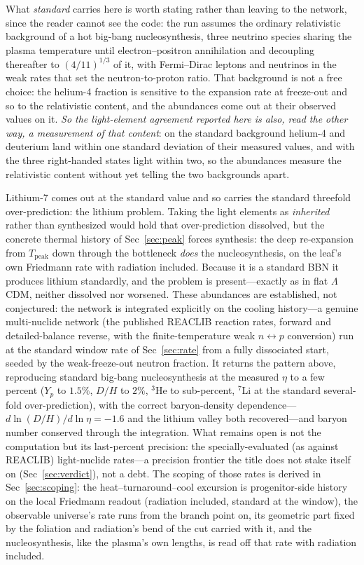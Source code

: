 \documentclass[11pt,a4paper]{article}
\theoremstyle{plain}
\theoremstyle{definition}
\theoremstyle{remark}
\newcommand{\Tpk}{T_{\mathrm{peak}}}
\begin{document}
What \emph{standard} carries here is worth stating rather than leaving to the network, since the reader cannot see the code: the run assumes the ordinary relativistic background of a hot big-bang nucleosynthesis, three neutrino species sharing the plasma temperature until electron--positron annihilation and decoupling thereafter to $(4/11)^{1/3}$ of it, with Fermi--Dirac leptons and neutrinos in the weak rates that set the neutron-to-proton ratio. That background is not a free choice: the helium-4 fraction is sensitive to the expansion rate at freeze-out and so to the relativistic content, and the abundances come out at their observed values on it. \emph{So the light-element agreement reported here is also, read the other way, a measurement of that content}: on the standard background helium-4 and deuterium land within one standard deviation of their measured values, and with the three right-handed states light within two, so the abundances measure the relativistic content without yet telling the two backgrounds apart.

Lithium-7 comes out at the standard value and so carries the standard threefold
over-prediction: the lithium problem. Taking the light elements as \emph{inherited} rather than
synthesized would hold that over-prediction dissolved, but the concrete thermal history of
Sec~\ref{sec:peak} forces synthesis: the deep re-expansion from $\Tpk$ down through the
bottleneck \emph{does} the nucleosynthesis, on the leaf's own Friedmann rate with radiation
included. Because it is a standard BBN it produces lithium standardly,
and the problem is present---exactly as in flat $\Lambda$CDM, neither dissolved nor worsened. These
abundances are established, not conjectured: the network is integrated explicitly on the
cooling history---a genuine multi-nuclide network (the published REACLIB reaction rates, forward and
detailed-balance reverse, with the finite-temperature weak $n\!\leftrightarrow\!p$ conversion) run
at the standard window rate of Sec~\ref{sec:rate} from a fully dissociated start, seeded by the
weak-freeze-out neutron fraction. It returns the pattern above, reproducing standard big-bang
nucleosynthesis at the measured $\eta$ to a few percent ($Y_p$ to $1.5\%$, $D/H$ to $2\%$,
${}^{3}$He to sub-percent, ${}^{7}$Li at the standard several-fold over-prediction), with the correct
baryon-density dependence---$d\ln(D/H)/d\ln\eta=-1.6$ and the lithium valley both recovered---and
baryon number conserved through the integration. What remains open is not the computation but its
last-percent precision: the specially-evaluated (as against REACLIB) light-nuclide rates---a
precision frontier the title does not stake itself on (Sec~\ref{sec:verdict}), not a debt. The
scoping of those rates is derived in Sec~\ref{sec:scoping}: the heat--turnaround--cool excursion
is progenitor-side history on the local Friedmann readout (radiation included, standard at the
window), the observable universe's rate runs from the branch point on, its geometric part fixed by the foliation and
radiation's bend of the cut carried with it, and the
nucleosynthesis, like the plasma's own lengths, is read off that rate with radiation included.
\end{document}

